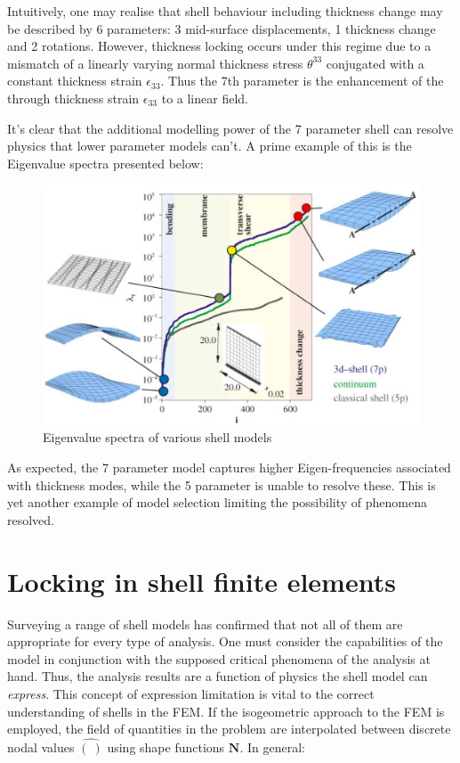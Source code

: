 Intuitively, one may realise that shell behaviour including thickness change may be described by 6 parameters:  3 mid-surface displacements, 1 thickness change and 2 rotations.  However, thickness locking occurs under this regime due to a mismatch of a linearly varying normal thickness stress $\theta^{33}$ conjugated with a constant thickness strain $\epsilon_{33}$. Thus the 7th parameter is the enhancement of the through thickness strain $\epsilon_{33}$ to a linear field.

It's clear that the additional modelling power of the 7 parameter shell can resolve physics that lower parameter models can't. A prime example of this is the Eigenvalue spectra presented below:

\begin{figure}[H]
	\centering
	\def\svgwidth{\columnwidth}
	\includegraphics[width=12cm]{images/eigenvaluespectra.png}
	\caption{Eigenvalue spectra of various shell models \cite{RammLitBook04}}
	\label{shelleigenvaluespectra}
\end{figure}

As expected, the 7 parameter model captures higher Eigen-frequencies associated with thickness modes, while the 5 parameter is unable to resolve these. This is yet another example of model selection limiting the possibility of phenomena resolved.

\section{Locking in shell finite elements}

Surveying a range of shell models has confirmed that not all of them are appropriate for every type of analysis. One must consider the capabilities of the model in conjunction with the supposed critical phenomena of the analysis at hand. Thus, the analysis results are a function of physics the shell model can \textit{express}. This concept of expression limitation is vital to the correct understanding of shells in the FEM. If the isogeometric approach to the FEM is employed, the field of quantities in the problem are interpolated between discrete nodal values $\hat{(\ )}$ using shape functions $\mathbf{N}$. In general:

